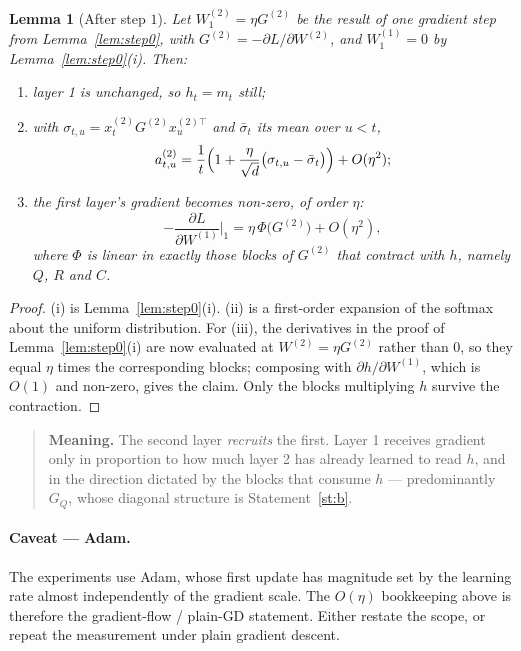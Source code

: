 \documentclass[11pt,a4paper]{article}
\theoremstyle{plain}
\newtheorem{lemma}{Lemma}
\theoremstyle{definition}
\newcommand{\1}{\mathbf{1}}
\begin{document}
\begin{lemma}[After step $1$]\label{lem:step1}
Let $W^{(2)}_1=\eta G^{(2)}$ be the result of one gradient step from Lemma~\ref{lem:step0}, with
$G^{(2)}=-\partial L/\partial W^{(2)}$, and $W^{(1)}_1=0$ by Lemma~\ref{lem:step0}(i). Then:
\begin{enumerate}[label=(\roman*),nosep]
\item layer 1 is unchanged, so $h_t=m_t$ still;
\item with $\sigma_{t,u}=x^{(2)}_tG^{(2)}x^{(2)\top}_u$ and $\bar\sigma_t$ its mean over $u<t$,
\begin{equation}
a^{(2)}_{t,u}=\frac1t\Bigl(1+\frac{\eta}{\sqrt d}\bigl(\sigma_{t,u}-\bar\sigma_t\bigr)\Bigr)
+O(\eta^2);
\end{equation}
\item the first layer's gradient becomes non-zero, of order $\eta$:
\begin{equation}
-\frac{\partial L}{\partial W^{(1)}}\bigg|_{1}=\eta\,\Phi\bigl(G^{(2)}\bigr)+O(\eta^2),
\end{equation}
where $\Phi$ is linear in exactly those blocks of $G^{(2)}$ that contract with $h$, namely $Q$,
$R$ and $C$.
\end{enumerate}
\end{lemma}

\begin{proof}
(i) is Lemma~\ref{lem:step0}(i). (ii) is a first-order expansion of the softmax about the uniform
distribution. For (iii), the derivatives in the proof of Lemma~\ref{lem:step0}(i) are now evaluated
at $W^{(2)}=\eta G^{(2)}$ rather than $0$, so they equal $\eta$ times the corresponding blocks;
composing with $\partial h/\partial W^{(1)}$, which is $O(1)$ and non-zero, gives the claim. Only
the blocks multiplying $h$ survive the contraction.
\end{proof}

\begin{quote}
\textbf{Meaning.} The second layer \emph{recruits} the first. Layer 1 receives gradient only in
proportion to how much layer 2 has already learned to read $h$, and in the direction dictated by
the blocks that consume $h$ --- predominantly $G_Q$, whose diagonal structure is
Statement~\ref{st:b}.
\end{quote}

\paragraph{Caveat --- Adam.}
The experiments use Adam, whose first update has magnitude set by the learning rate almost
independently of the gradient scale. The $O(\eta)$ bookkeeping above is therefore the
gradient-flow / plain-GD statement. Either restate the scope, or repeat the measurement under
plain gradient descent.
\end{document}
